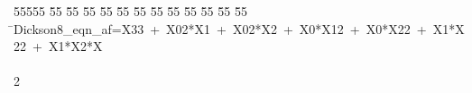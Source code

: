%
%
\begin{tabbing}
55555 \= 55 \= 55 \= 55 \= 55 \= 55 \= 55 \= 55 \= 55 \= 55 \= 55 \= 55 \= 55 \= \>Dickson8\_eqn\_af=X33\ +\ X02*X1\ +\ X02*X2\ +\ X0*X12\ +\ X0*X22\ +\ X1*X22\ +\ X1*X2*X\\[0pt]
\\[0pt]
2\>\end{tabbing}
